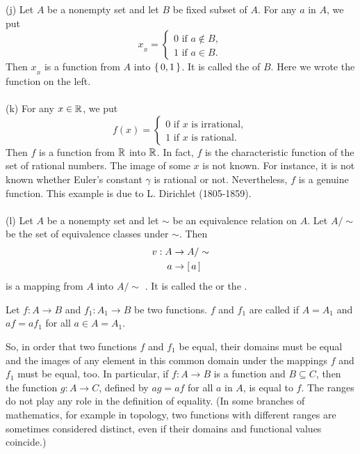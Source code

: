 \documentclass[11pt]{amsbook}
\begin{document}
\noindent(j) Let $A$ be a nonempty set and let $B$ be fixed subset of $A$. For any $a$ in $A$, we put
$$x_{\!_B} = \begin{cases} 0 \text{ if }a \notin B, \\
 1\text{ if }a \in B.\end{cases}$$
Then $x_{\!_ B}$ is a function from $A$ into $  \left \{ \, 0,1 \, \right \}  $. It is called the  of $B$. Here we wrote the function on the left.\\\\

\noindent(k) For any $x \in \mathbb{R}$, we put
$$f(x) = \begin{cases} 0 \text{ if }x\text{  is irrational},\\
 1\text{ if }x\text{ is rational}.\end{cases}$$
Then $f$ is a function from $\mathbb{R}$ into $\mathbb{R}$. In fact, $f$ is the characteristic function of the set of rational numbers. The image of some $x$ is not known. For instance, it is not known whether Euler's constant $\gamma$ is rational or not. Nevertheless, $f$ is a genuine function. This example is due to L. Dirichlet (1805-1859). \\\\

\noindent(l) Let $A$ be a nonempty set and let $\sim$ be an equivalence relation on $A$. Let $A/\sim$ be the set of equivalence classes under $\sim$. Then 
\begin{align*}
v: A &\rightarrow A/\sim \\
a&\rightarrow  \left[ \, a \,\right] \\
\end{align*}
is a mapping from $A$ into $A/\sim$ . It is called the  or the .
\begin{defn}
Let $f: A\rightarrow B$ and $f_1:A_1\rightarrow B$ be two functions. $f$ and $f_1$ are called  if $A=A_1$ and $af=af_1$ for all $a\in A=A_1$.
\end{defn}
So, in order that two functions $f$ and $f_1$ be equal, their domains must be equal and the images of any element in this common domain under the mappings $f$ and $f_1$ must be equal, too. In particular, if $f:A\rightarrow B$ is a function and $B\subseteq C$, then the function $g:A\rightarrow C$, defined by $ag=af$ for all $a$ in $A$, is equal to $f$.  The ranges do not play any role in the definition of equality. (In some branches of mathematics, for example in topology, two functions with different ranges are sometimes considered distinct, even if their domains and functional values coincide.) 
\end{document}
